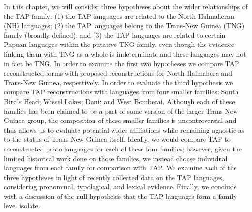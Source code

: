 In this chapter, we will consider three hypotheses about the wider relationships of the TAP family: (1) the TAP languages are related to the North Halmaheran (NH) languages; (2) the TAP languages belong to the Trans-New Guinea (TNG) family (broadly defined); and (3) the TAP languages are related to certain Papuan languages within the putative TNG family, even though the evidence linking them with TNG as a whole is indeterminate and these languages may not in fact be TNG. In order to examine the first two hypotheses we compare TAP reconstructed forms with proposed reconstructions for North Halmahera and Trans-New Guinea, respectively. In order to evaluate the third hypothesis we compare TAP reconstructions with languages from four smaller families: South Bird{\textquoteright}s Head; Wissel Lakes; Dani; and West Bomberai. Although each of these families has been claimed to be a part of some version of the larger Trans-New Guinea group, the composition of these smaller families is uncontroversial and thus 
allows us to evaluate potential wider affiliations while remaining agnostic as to the status of Trans-New Guinea itself. Ideally, we would compare TAP to reconstructed proto-languages for each of these four families; however, given the limited historical work done on those families, we instead choose individual languages from each family for comparison with TAP. We examine each of the three hypotheses in light of recently collected data on the TAP languages, considering pronominal, typological, and lexical evidence. Finally, we conclude with a discussion of the null hypothesis that the TAP languages form a family-level isolate.

